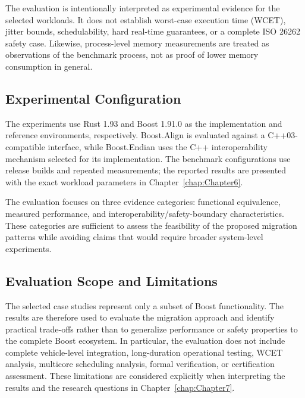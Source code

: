The evaluation is intentionally interpreted as experimental evidence for the selected
workloads. It does not establish worst-case execution time (WCET), jitter bounds,
schedulability, hard real-time guarantees, or a complete ISO 26262 safety case. Likewise,
process-level memory measurements are treated as observations of the benchmark process,
not as proof of lower memory consumption in general.

\subsection{Experimental Configuration}

The experiments use Rust 1.93 and Boost 1.91.0 as the implementation and reference
environments, respectively. Boost.Align is evaluated against a C++03-compatible interface,
while Boost.Endian uses the C++ interoperability mechanism selected for its implementation.
The benchmark configurations use release builds and repeated measurements; the reported
results are presented with the exact workload parameters in Chapter~\ref{chap:Chapter6}.

The evaluation focuses on three evidence categories: functional equivalence, measured
performance, and interoperability/safety-boundary characteristics. These categories are
sufficient to assess the feasibility of the proposed migration patterns while avoiding
claims that would require broader system-level experiments.

\subsection{Evaluation Scope and Limitations}

The selected case studies represent only a subset of Boost functionality. The results are
therefore used to evaluate the migration approach and identify practical trade-offs rather
than to generalize performance or safety properties to the complete Boost ecosystem.
In particular, the evaluation does not include complete vehicle-level integration,
long-duration operational testing, WCET analysis, multicore scheduling analysis, formal
verification, or certification assessment. These limitations are considered explicitly
when interpreting the results and the research questions in Chapter~\ref{chap:Chapter7}.

